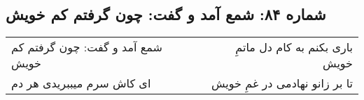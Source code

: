 \begin{center}
\section*{شماره ۸۴: شمع آمد و گفت: چون گرفتم کم خویش}
\label{sec:084}
\begin{longtable}{l p{0.5cm} r}
شمع آمد و گفت: چون گرفتم کم خویش
&&
باری بکنم به کام دل ماتمِ خویش
\\
ای کاش سرم میببریدی هر دم
&&
تا بر زانو نهادمی در غمِ خویش
\\
\end{longtable}
\end{center}
